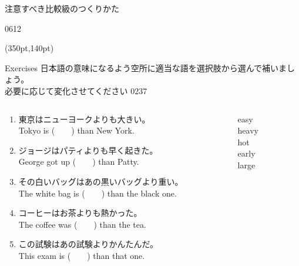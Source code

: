 \documentclass[aspectratio=169,xcolor={dvipsnames,table}]{beamer}
\begin{document}
\begin{frame}[plain,label=table2]{注意すべき比較級のつくりかた}
\vfill

%
\hfill{\tiny 0612}\,{\scriptsize {}}

\begin{textblock*}{0.4\linewidth}(350pt,140pt)
\end{textblock*}
\end{frame}
\begin{frame}[plain]{Exercises}
 日本語の意味になるよう空所に適当な語を選択肢から選んで補いましょう。\\必要に応じて変化させてください%
\hfill{\tiny 0237}\,{\scriptsize {}}

\begin{columns}[t]
 \begin{column}{.78\textwidth}
   \begin{enumerate}
  \item 東京はニューヨークよりも大きい。\\
	Tokyo is (~~~~) than New York. 
    \item ジョージはパティよりも早く起きた。\\
	George got up (~~~~) than Patty. 
    \item その白いバッグはあの黒いバッグより重い。\\
	The white bag is (~~~~) than the black one. 
    \item コーヒーはお茶よりも熱かった。\\
	The coffee was (~~~~) than the tea. 
    \item この試験はあの試験よりかんたんだ。\\
	This exam  is (~~~~) than that one. 
 \end{enumerate}
 \end{column}
\begin{column}{.2\textwidth}
 \begin{tcolorbox}
  easy\\
  heavy\\
  hot\\
  early\\
  large
 \end{tcolorbox}
\end{column}
\end{columns}
\end{frame}
\end{document}
